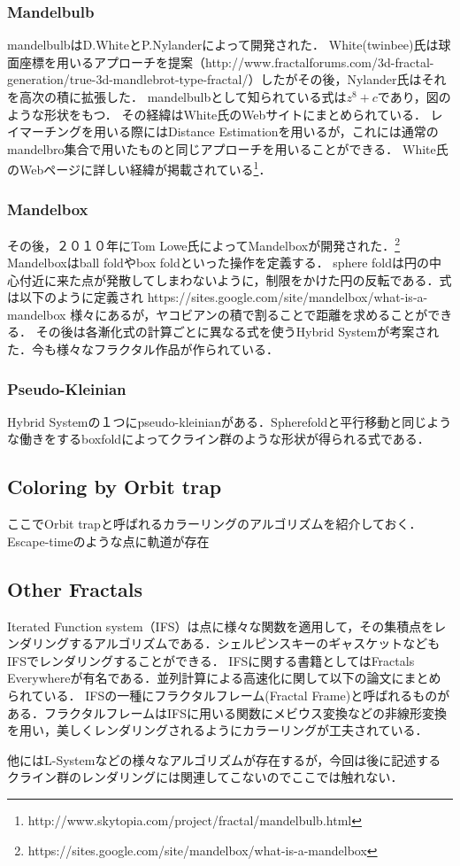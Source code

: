 \subsubsection{Mandelbulb}
mandelbulbはD.WhiteとP.Nylanderによって開発された．
White(twinbee)氏は球面座標を用いるアプローチを提案（http://www.fractalforums.com/3d-fractal-generation/true-3d-mandlebrot-type-fractal/）したがその後，Nylander氏はそれを高次の積に拡張した．
mandelbulbとして知られている式は$z^8 + c $であり，図のような形状をもつ．
その経緯はWhite氏のWebサイトにまとめられている．
レイマーチングを用いる際にはDistance Estimationを用いるが，これには通常のmandelbro集合で用いたものと同じアプローチを用いることができる．
White氏のWebページに詳しい経緯が掲載されている\footnote{http://www.skytopia.com/project/fractal/mandelbulb.html}．

\subsubsection{Mandelbox}
その後，２０１０年にTom Lowe氏によってMandelboxが開発された．\footnote{https://sites.google.com/site/mandelbox/what-is-a-mandelbox}
Mandelboxはball foldやbox foldといった操作を定義する．
sphere foldは円の中心付近に来た点が発散してしまわないように，制限をかけた円の反転である．式は以下のように定義され
https://sites.google.com/site/mandelbox/what-is-a-mandelbox
様々にあるが，ヤコビアンの積で割ることで距離を求めることができる．
その後は各漸化式の計算ごとに異なる式を使うHybrid Systemが考案された．今も様々なフラクタル作品が作られている．

\subsubsection{Pseudo-Kleinian}
Hybrid Systemの１つにpseudo-kleinianがある．Spherefoldと平行移動と同じような働きをするboxfoldによってクライン群のような形状が得られる式である．

\subsection{Coloring by Orbit trap}

ここでOrbit trapと呼ばれるカラーリングのアルゴリズムを紹介しておく．Escape-timeのような点に軌道が存在

\subsection{Other Fractals}

Iterated Function system（IFS）は点に様々な関数を適用して，その集積点をレンダリングするアルゴリズムである．シェルピンスキーのギャスケットなどもIFSでレンダリングすることができる．
IFSに関する書籍としてはFractals Everywhere\cite{fractalsEverywhere}が有名である．並列計算による高速化に関して以下の論文にまとめられている\cite{highPerformanceIFS}\cite{GPUIFS}．
IFSの一種にフラクタルフレーム(Fractal Frame)\cite{fractalFrame}と呼ばれるものがある．フラクタルフレームはIFSに用いる関数にメビウス変換などの非線形変換を用い，美しくレンダリングされるようにカラーリングが工夫されている．

他にはL-Systemなどの様々なアルゴリズムが存在するが，今回は後に記述するクライン群のレンダリングには関連してこないのでここでは触れない．
